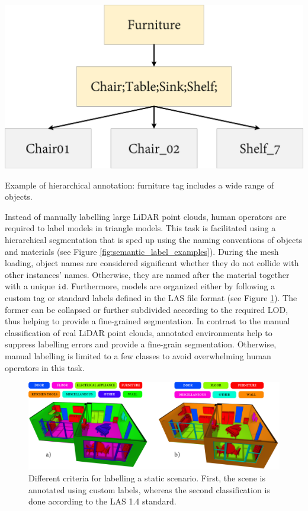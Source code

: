 \begin{marginfigure}[1.5cm]
    \centering
    \includegraphics[width=\linewidth]{figs/lidar_simulation/semantic_labels_example.png}
	\caption{Example of hierarchical annotation: furniture tag includes a wide range of objects. }
	\label{fig:semantic_label_examples}
\end{marginfigure}
Instead of manually labelling large LiDAR point clouds, human operators are required to label models in triangle models. This task is facilitated using a hierarchical segmentation that is sped up using the naming conventions of objects and materials (see Figure \ref{fig:semantic_label_examples}). During the mesh loading, object names are considered significant whether they do not collide with other instances' names. Otherwise, they are named after the material together with a unique $\mathtt{id}$. Furthermore, models are organized either by following a custom tag or standard labels defined in the LAS file format (see Figure \ref{fig:kitchen_classification}). The former can be collapsed or further subdivided according to the required LOD, thus helping to provide a fine-grained segmentation. In contrast to the manual classification of real LiDAR point clouds, annotated environments help to suppress labelling errors and provide a fine-grain segmentation. Otherwise, manual labelling is limited to a few classes to avoid overwhelming human operators in this task.

\begin{figure}[ht]
    \centering
    \includegraphics[width=\linewidth]{figs/lidar_simulation/semantic_labels.png}
	\caption{Different criteria for labelling a static scenario. First, the scene is annotated using custom labels, whereas the second classification is done according to the LAS 1.4 standard.}
	\label{fig:kitchen_classification}
\end{figure}

